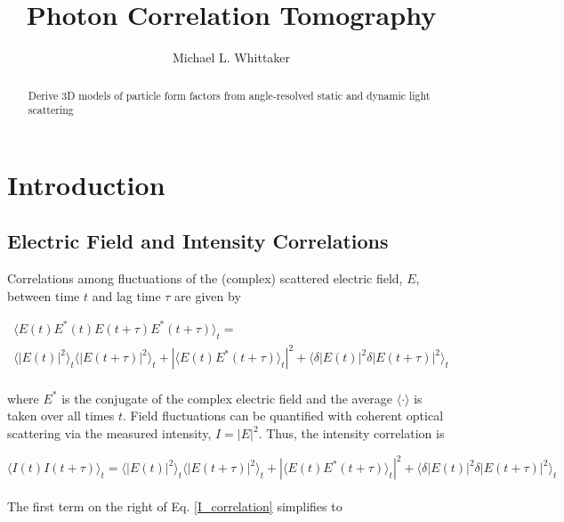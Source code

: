 \documentclass{article}
\title{Photon Correlation Tomography}
\author{Michael L. Whittaker}
\begin{document}
\maketitle

\begin{abstract}
Derive 3D models of particle form factors from angle-resolved static and dynamic light scattering
\end{abstract}

\section{Introduction}
\subsection{Electric Field and Intensity Correlations}
Correlations among fluctuations of the (complex) scattered electric field, $E$, between time $t$ and lag time $\tau$ are given by

\begin{equation}\label{E_correlation}
\begin{split}
    \langle E \left(t\right) E^* \left(t\right) E \left( t+\tau\right) E^*\left(t+\tau\right)\rangle_t = \\
    \langle \left| E\left(t \right)\right|^2 \rangle_t \langle \left| E \left(t+\tau \right)\right|^2 \rangle_t + 
    \left| \langle E \left(t \right) E^* \left(t+\tau \right) \rangle_t \right|^2 + 
    \langle \delta \left| E \left(t\right)\right|^2 \delta\left| E \left(t+\tau \right)\right|^2\rangle_t
\end{split}
\end{equation}
\\
where $E^*$ is the conjugate of the complex electric field and the average $\langle \cdot \rangle$ is taken over all times $t$. Field fluctuations can be quantified with coherent optical scattering via the measured intensity, $I = \vert E \vert^2$. Thus, the intensity correlation is

\begin{equation}\label{I_correlation}
    \langle I(t)I(t + \tau) \rangle_t = 
    \langle \left| E\left(t \right)\right|^2 \rangle_t \langle \left| E \left(t+\tau \right)\right|^2 \rangle_t + 
    \left| \langle E \left(t \right) E^* \left(t+\tau \right) \rangle_t \right|^2 + 
    \langle \delta \left| E \left(t\right)\right|^2 \delta\left| E \left(t+\tau \right)\right|^2\rangle_t
\end{equation}
\\
The first term on the right of Eq. \ref{I_correlation} simplifies to
\end{document}
